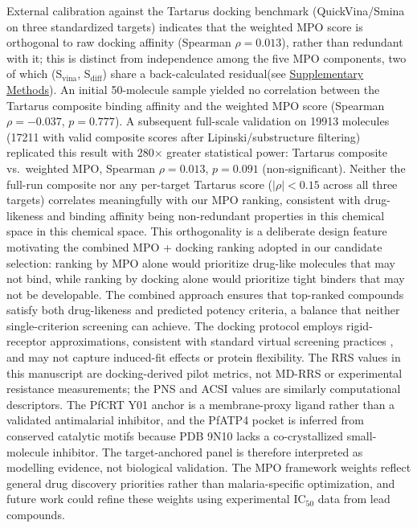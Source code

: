 \documentclass[journal=jcisd8,manuscript=article]{achemso}
\begin{document}
External calibration against the Tartarus docking benchmark \citep{nigam2023tartarus} (QuickVina/Smina on three standardized targets) indicates that the weighted
MPO score is orthogonal to raw docking affinity (Spearman $\rho = \num{0.013}$), rather than redundant with it; this is distinct from independence among the
five MPO components, two of which (S$_{\text{vina}}$, S$_{\text{diff}}$) share a back-calculated residual(see \hyperref[SM-sec:mpo_sensitivity_methods]{Supplementary Methods}). An initial 50-molecule sample yielded no correlation between the Tartarus composite binding affinity and the
weighted MPO score (Spearman $\rho = \num{-0.037}$, $p = \num{0.777}$). A subsequent full-scale validation on \num{19913} molecules (\num{17211} with valid
composite scores after Lipinski/substructure filtering) replicated this result with \num{280}$\times$ greater statistical power: Tartarus composite vs.\
weighted MPO, Spearman $\rho = \num{0.013}$, $p = \num{0.091}$ (non-significant). Neither the full-run composite nor any per-target Tartarus score ($|\rho| <
\num{0.15}$ across all three targets) correlates meaningfully with our MPO ranking, consistent with drug-likeness and binding affinity being non-redundant properties in this chemical space
in this chemical space. This orthogonality is a deliberate design feature motivating the combined MPO + docking ranking adopted in our candidate selection:
ranking by MPO alone would prioritize drug-like molecules that may not bind, while ranking by docking alone would prioritize tight binders that may not be
developable. The combined approach ensures that top-ranked compounds satisfy both drug-likeness and predicted potency criteria, a balance that neither
single-criterion screening can achieve. The docking protocol employs rigid-receptor approximations, consistent with standard virtual screening practices
\citep{kitchen2004, shoichet2004}, and may not capture induced-fit effects or protein flexibility. The RRS values in this manuscript are docking-derived pilot metrics, not MD-RRS or experimental resistance measurements; the PNS and ACSI values are similarly computational descriptors. The PfCRT Y01 anchor is a membrane-proxy ligand rather than a validated antimalarial inhibitor, and the PfATP4 pocket is inferred from conserved catalytic motifs because PDB 9N10 lacks a co-crystallized small-molecule inhibitor. The target-anchored panel is therefore interpreted as modelling evidence, not biological validation. The MPO framework weights reflect general drug discovery priorities rather than malaria-specific optimization, and future work could refine these weights using experimental IC$_{50}$ data from lead compounds.
\end{document}
